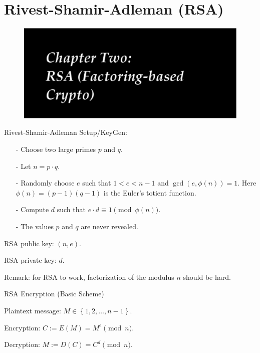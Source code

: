 \documentclass{beamer}
\begin{document}
\section{Rivest-Shamir-Adleman (RSA)}
\begin{frame}{}
\begin{figure}[htbp]
\centering
  \includegraphics[width=\textwidth]{img/chap2-rsa.pdf}
\end{figure}
\end{frame}

\begin{frame}{Rivest-Shamir-Adleman}
Setup/KeyGen:
\begin{itemize}
\item[-] Choose two large primes $p$ and $q$.
\item[-] Let $n = p \cdot q$.
\item[-] Randomly choose $e$ such that $1< e < n-1$ and $\gcd(e, \phi(n)) = 1$. 
Here $\phi(n) = (p-1)(q-1)$ is the Euler's totient function.
\item[-] Compute $d$ such that $e\cdot d \equiv 1 \pmod{\phi(n)}$.
\item[-] The values $p$ and $q$ are never revealed.
\end{itemize}

\begin{block}{}
RSA public key: $(n, e)$.

RSA private key: $d$.
\end{block}

\vskip 10pt

Remark: for RSA to work, factorization of the modulus $n$ should be hard.
\end{frame}

\begin{frame}{RSA Encryption (Basic Scheme)}
\begin{block}{}
Plaintext message: $M\in\left\{1, 2, \ldots, n-1\right\}$.

Encryption: $C := E(M) = M^e \pmod{n}$.

Decryption: $M := D(C) = C^d \pmod{n}$.
\end{block}
\end{frame}
\end{document}
